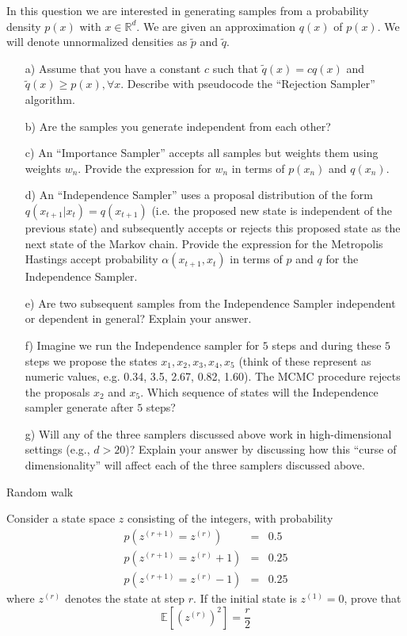 \documentclass{amsmlaj}
\begin{document}
\begin{problem}
In this question we are interested in generating samples from a probability density $p(x)$ with $x\in\mathbb{R}^d$. We are given an approximation $q(x)$ of $p(x)$. We will denote unnormalized densities as $\tilde{p}$ and $\tilde{q}$. 
\begin{itemize}
\item[a)] Assume that you have a constant $c$ such that $\tilde{q}(x)=c q(x)$ and $\tilde{q}(x)\geq p(x), \forall x$. Describe with pseudocode the ``Rejection Sampler'' algorithm.  
\item[b)] Are the samples you generate independent from each other?
\item[c)] An ``Importance Sampler'' accepts all samples but weights them using weights $w_n$. Provide the expression for $w_n$ in terms of $p(x_n)$ and $q(x_n)$.
\item[d)]  An ``Independence Sampler'' uses a proposal distribution of the form $q(x_{t+1}|x_t) = q(x_{t+1})$ (i.e. the proposed new state is independent of the previous state) and subsequently accepts or rejects this proposed state as the next state of the Markov chain. Provide the expression for the Metropolis Hastings accept probability $\alpha(x_{t+1},x_t)$ in terms of $p$ and $q$ for the Independence Sampler.
\item[e)] Are two subsequent samples from the Independence Sampler independent or dependent in general? Explain your answer.
\item[f)] Imagine we run the Independence sampler for $5$ steps and during these $5$ steps we propose the states $x_1,x_2,x_3,x_4,x_5$ (think of these represent as numeric values, e.g. 0.34, 3.5, 2.67, 0.82, 1.60). The MCMC procedure rejects the proposals $x_2$ and $x_5$. Which sequence of states will the Independence sampler generate after $5$ steps?
\item[g)] Will any of the three samplers discussed above work in high-dimensional settings (e.g., $d>20$)? Explain your answer by discussing how this ``curse of dimensionality'' will affect each of the three samplers discussed above.
\end{itemize}
\end{problem}


\begin{problem}\textsf{Random walk}

Consider a state space $z$ consisting of the integers, with probability
\begin{eqnarray}
p(z^{(r+1)} = z^{(r)}) & = & 0.5 \nonumber \\
p(z^{(r+1)} = z^{(r)}+1) & = & 0.25 \nonumber \\
p(z^{(r+1)} = z^{(r)}-1) & = & 0.25 \nonumber 
\end{eqnarray}
where $z^{(r)}$ denotes the state at step $r$. If the initial state is $z^{(1)}=0$, prove that 
$$
\mathbb{E}\left[(z^{(r)})^2\right]=\frac{r}{2}
$$

\end{problem}
\end{document}

